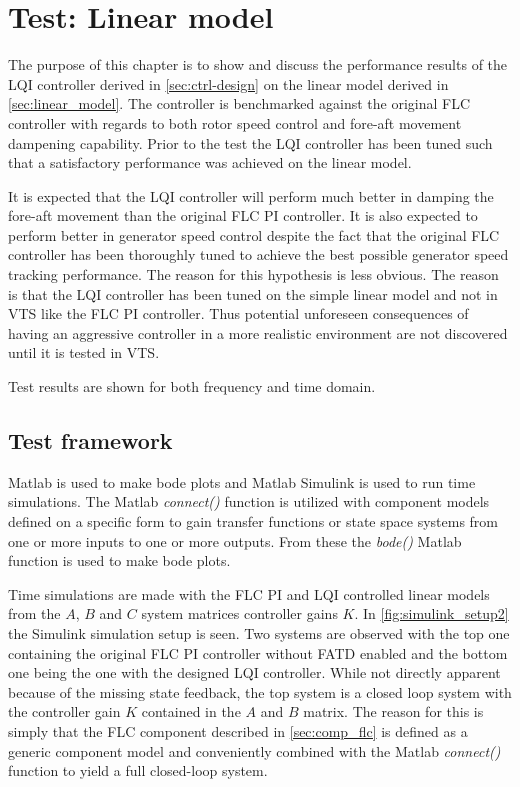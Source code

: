 \section{Test: Linear model}
The purpose of this chapter is to show and discuss the performance results of the LQI controller derived in \cref{sec:ctrl-design} on the linear model derived in \cref{sec:linear_model}. The controller is benchmarked against the original FLC controller with regards to both rotor speed control and fore-aft movement dampening capability. Prior to the test the LQI controller has been tuned such that a satisfactory performance was achieved on the linear model. 

It is expected that the LQI controller will perform much better in damping the fore-aft movement than the original FLC PI controller. It is also expected to perform better in generator speed control despite the fact that the original FLC controller has been thoroughly tuned to achieve the best possible generator speed tracking performance. The reason for this hypothesis is less obvious. The reason is that the LQI controller has been tuned on the simple linear model and not in VTS like the FLC PI controller. Thus potential unforeseen consequences of having an aggressive controller in a more realistic environment are not discovered until it is tested in VTS.

Test results are shown for both frequency and time domain.


\subsection{Test framework}
Matlab is used to make bode plots and Matlab Simulink is used to run time simulations. The Matlab \textit{connect()} function is utilized with component models defined on a specific form to gain transfer functions or state space systems from one or more inputs to one or more outputs. From these the \textit{bode()} Matlab function is used to make bode plots. 

Time simulations are made with the FLC PI and LQI controlled linear models from the $ A $, $ B $ and $ C $ system matrices controller gains $ K $. In \cref{fig:simulink_setup2} the Simulink simulation setup is seen. Two systems are observed with the top one containing the original FLC PI controller without FATD enabled and the bottom one being the one with the designed LQI controller. While not directly apparent because of the missing state feedback, the top system is a closed loop system with the controller gain $ K $ contained in the $ A $ and $ B $ matrix. The reason for this is simply that the FLC component described in \cref{sec:comp_flc} is defined as a generic component model and conveniently combined with the Matlab \textit{connect()} function to yield a full closed-loop system. 

